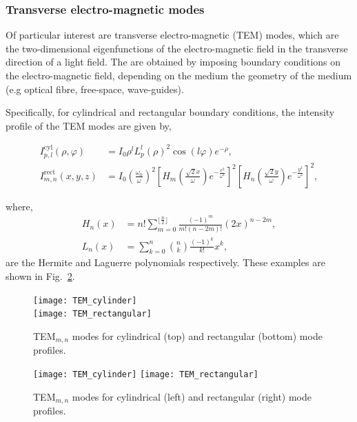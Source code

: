 \subsubsection{Transverse electro-magnetic modes}

Of particular interest are transverse electro-magnetic (TEM) modes, which are the two-dimensional eigenfunctions of the electro-magnetic field in the transverse direction of a light field. The are obtained by imposing boundary conditions on the electro-magnetic field, depending on the medium the geometry of the medium (e.g optical fibre, free-space, wave-guides).

Specifically, for cylindrical and rectangular boundary conditions, the intensity profile of the TEM modes are given by,
\begin{widetext}
\begin{align*}
	I_{p,l}^{\mathrm{cyl}}(\rho,\varphi) &= I_0 \rho^l L_p^l(\rho)^2 \cos(l\varphi)e^{-\rho},\nonumber\\
	I_{m,n}^{\mathrm{rect}}(x,y,z) &= I_0\left(\frac{\omega_0}{\omega}\right)^2 \left[H_m\left(\frac{\sqrt{2}x}{\omega}\right)e^{-\frac{x^2}{\omega^2}}\right]^2 \left[H_n\left(\frac{\sqrt{2}y}{\omega}\right)e^{-\frac{y^2}{\omega^2}}\right]^2,
\end{align*}
\end{widetext}
where,
\begin{align}
	H_n(x) &= n! \sum_{m=0}^{\lfloor \frac{n}{2}\rfloor} \frac{(-1)^m}{m!(n-2m)!} (2x)^{n-2m},\nonumber\\
	L_n(x) &= \sum_{k=0}^n \binom{n}{k} \frac{(-1)^k}{k!}x^k,
\end{align}
are the Hermite and Laguerre polynomials respectively. These examples are shown in Fig.~\ref{fig:TEM_modes}.

\pubmode
	\begin{figure}[!htbp]
	\texttt{[image: TEM\_cylinder]}\\
	\texttt{[image: TEM\_rectangular]}
	\captionspacefig \caption{TEM$_{m,n}$ modes for cylindrical (top) and rectangular (bottom) mode profiles.}\label{fig:TEM_modes}
	\end{figure}
\else
	\begin{figure}[!htbp]
	\texttt{[image: TEM\_cylinder]}
	\texttt{[image: TEM\_rectangular]}
	\captionspacefig \caption{TEM$_{m,n}$ modes for cylindrical (left) and rectangular (right) mode profiles.}\label{fig:TEM_modes}
	\end{figure}
\fi

